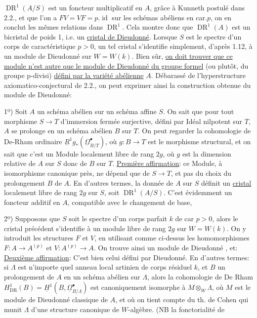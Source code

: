 $\operatorname{DR}^1(A/S)$ est un foncteur  multiplicatif en $A$, grâce à Kunneth postulé dans 2.2., et que l'on a $FV=VF=p.\operatorname{id}$ sur les schémas abéliens en car.$p$, on en conclut les mêmes relations dans $\operatorname{DR}^1$. Cela montre donc que $\operatorname{DR}^1(A)$ est un bicristal de poids 1, i.e. un \uline{cristal de Dieudonné}. Lorsque $S$ est le spectre d'un corps  de caractéristique $p>0$, un tel cristal s'identifie simplement, d'après 1.12, à un module de Dieudonné sur $W=W(k)$. Bien sûr, \uline{on doit trouver que ce module n'est autre que le module de Dieudonné du groupe formel}  (ou plutôt, du groupe p-divisi) \uline{défini par la variété abélienne} $A$. Débarassé de l'hyperstructure axiomatico-conjectural de 2.2.,  on peut exprimer ainsi la construction  obtenue du module de Dieudonné:

1º) Soit $A$ un schéma abélien sur un schéma affine $S$. On sait que pour tout morphisme $S\longrightarrow T$ d'immersion fermée surjective, défini par Idéal nilpotent sur $T$, $A$ se prolonge en un schéma abélien $B$ sur $T$. On peut regarder la cohomologie de De-Rham ordinaire $\underline{R}^1g_*(\underline{\Omega}^{\bullet}_{B/T})$, où $g:B\longrightarrow T$ est le morphisme structural, et on sait que c'est un Module localement libre de rang $2g$, où $g$ est la dimension relative de $A$ sur $S$ donc de $B$ sur $T$. \uline{Première affirmation}: ce Module, à isomorphisme canonique près, ne dépend que  de $S\longrightarrow T$, et pas du choix du prolongement $B$ de $A$. En d'autres termes, la donnée de $A$ sur $S$ définit un \uline{cristal} localement libre de rang $2g$ sur $S$, soit $\operatorname{DR}^1(A/S)$. C'est évidemment un foncteur additif en $A$, compatible avec le changement de base, 

2º) Supposons que $S$ soit le spectre d'un corps parfait $k$ de car $p>0$, alors le cristal précédent s'identifie à un module libre de rang $2g$ sur $W=W(k)$. On y introduit les structures $F$ et $V$, en utilisant comme ci-dessus les homomorphismes $F:A\longrightarrow A^{(p)}$ et $V:A^{(p)}\longrightarrow A$. On trouve ainsi un module de Dieudonné , et: \uline{Deuxième affirmation}: C'est bien celui défini par Dieudonné. En d'autres termes: si $\Lambda$ est n'importe quel anneau local artinien de corps résiduel $k$, et $B$ un prolongement de $A$ en un schéma abélien sur $\Lambda$, alors  la cohomologie de De Rham $H^1_{\operatorname{DR}}(B)=\underline{H}^1(B,\underline{\Omega}^{\bullet}_{B/\Lambda})$ est canoniquement  isomorphe à $M\otimes_W\Lambda$, où $M$ est le module de Dieudonné classique de $A$, et où on tient compte du th. de Cohen qui munit $\Lambda$ d'une structure canonique de $W$-algèbre. (NB la  fonctorialité de


